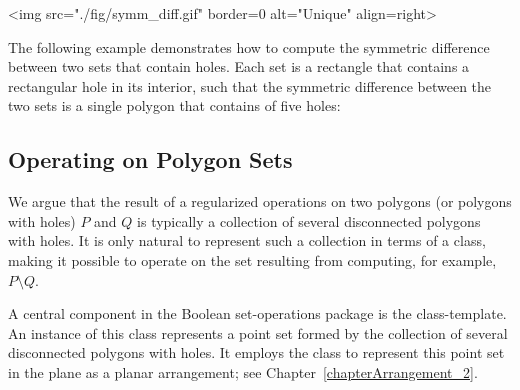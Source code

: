 \lcTex{%
  \setlength{\widthRight}{2.5cm}
  \setlength{\widthLeft}{\widthLineReal}
  \addtolength{\widthLeft}{-\widthRight}
  \begin{minipage}{\widthLeft}
}
\label{fig:sym_diff}
\begin{ccHtmlOnly}
  <img src="./fig/symm_diff.gif" border=0 alt="Unique" align=right>
\end{ccHtmlOnly}
The following example demonstrates how to compute the symmetric
difference between two sets that contain holes. Each set is a
rectangle that contains a rectangular hole in its interior, such that
the symmetric difference between the two sets is a single polygon that
contains of five holes:


\subsection{Operating on Polygon Sets}
\label{bso_ssec:main_component}

We argue that the result of a regularized operations on two polygons
(or polygons with holes) $P$ and $Q$ is typically a collection of
several disconnected polygons with holes. It is only natural to
represent such a collection in terms of a class, making it possible to
operate on the set resulting from computing, for example, $P \setminus
Q$.

A central component in the Boolean set-operations package is the
 class-template. An instance of this
class represents a point set formed by the collection of several disconnected
polygons with holes. It employs the  class to represent
this point set in the plane as a planar arrangement; see
Chapter~\ref{chapterArrangement_2}. 

